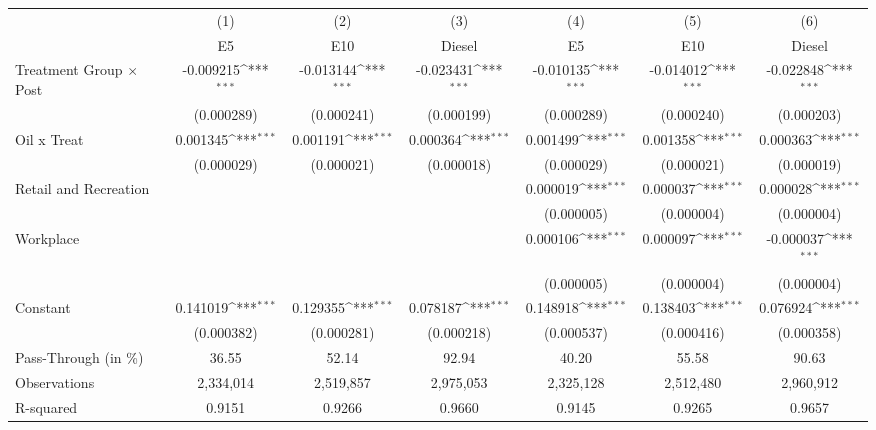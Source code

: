 {
\def\sym#1{\ifmmode^{#1}\else\(^{#1}\)\fi}
\begin{tabular}{l*{6}{c}}
\toprule
                    &\multicolumn{1}{c}{(1)}&\multicolumn{1}{c}{(2)}&\multicolumn{1}{c}{(3)}&\multicolumn{1}{c}{(4)}&\multicolumn{1}{c}{(5)}&\multicolumn{1}{c}{(6)}\\
                    &\multicolumn{1}{c}{E5}&\multicolumn{1}{c}{E10}&\multicolumn{1}{c}{Diesel}&\multicolumn{1}{c}{E5}&\multicolumn{1}{c}{E10}&\multicolumn{1}{c}{Diesel}\\
\midrule
Treatment Group $\times$ Post&   -0.009215\sym{***}&   -0.013144\sym{***}&   -0.023431\sym{***}&   -0.010135\sym{***}&   -0.014012\sym{***}&   -0.022848\sym{***}\\
                    &  (0.000289)         &  (0.000241)         &  (0.000199)         &  (0.000289)         &  (0.000240)         &  (0.000203)         \\
Oil x Treat         &    0.001345\sym{***}&    0.001191\sym{***}&    0.000364\sym{***}&    0.001499\sym{***}&    0.001358\sym{***}&    0.000363\sym{***}\\
                    &  (0.000029)         &  (0.000021)         &  (0.000018)         &  (0.000029)         &  (0.000021)         &  (0.000019)         \\
Retail and Recreation&                     &                     &                     &    0.000019\sym{***}&    0.000037\sym{***}&    0.000028\sym{***}\\
                    &                     &                     &                     &  (0.000005)         &  (0.000004)         &  (0.000004)         \\
Workplace           &                     &                     &                     &    0.000106\sym{***}&    0.000097\sym{***}&   -0.000037\sym{***}\\
                    &                     &                     &                     &  (0.000005)         &  (0.000004)         &  (0.000004)         \\
Constant            &    0.141019\sym{***}&    0.129355\sym{***}&    0.078187\sym{***}&    0.148918\sym{***}&    0.138403\sym{***}&    0.076924\sym{***}\\
                    &  (0.000382)         &  (0.000281)         &  (0.000218)         &  (0.000537)         &  (0.000416)         &  (0.000358)         \\
\midrule
Pass-Through (in \%)&       36.55         &       52.14         &       92.94         &       40.20         &       55.58         &       90.63         \\
Observations        &   2,334,014         &   2,519,857         &   2,975,053         &   2,325,128         &   2,512,480         &   2,960,912         \\
R-squared           &      0.9151         &      0.9266         &      0.9660         &      0.9145         &      0.9265         &      0.9657         \\
\bottomrule
\end{tabular}
}
